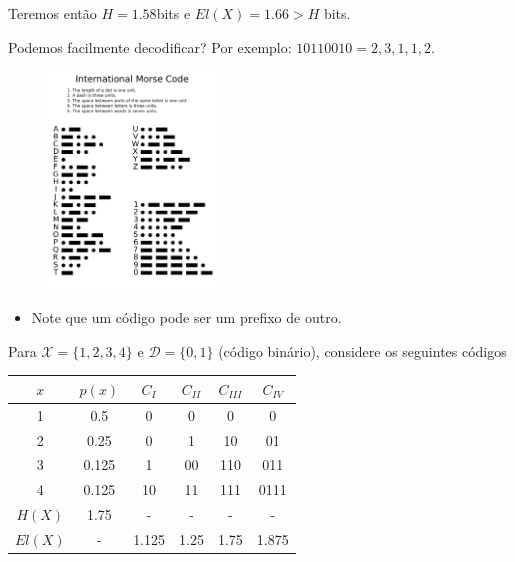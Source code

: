 \begin{frame}[allowframebreaks]
\begin{example}
  Teremos então $H = 1.58$bits e $El(X)=1.66 > H$ bits.
  \end{example}

  Podemos facilmente decodificar? Por exemplo: $10110010 = 2,3,1,1,2$.


  \framebreak


  \begin{figure}[h!]
  \centering
  \includegraphics[width=0.4\textwidth]{images/International_Morse_Code.pdf}
  \label{fig:International_Morse_Code}
  \end{figure}

  \begin{itemize}
  \item Note que um código pode ser um prefixo de outro.
  \end{itemize}

  \framebreak

  Para $\mathcal{X} = \{1,2,3,4\}$ e $\mathcal{D}=\{0,1\}$ (código binário), considere os seguintes códigos

  \begin{center}
  \begin{tabular}{c|c|c|c|c|c}
  $x$ 		& $p(x)$& $C_I$ & $C_{II}$ & $C_{III}$ & $C_{IV}$ \\ \hline
  1		& 0.5	&  0	&   0	&  0 		&   0	\\ 
  2		& 0.25	&  0	&   1 	& 10		&  01	\\
  3		& 0.125	&  1	&  00	& 110		& 011 	\\
  4		& 0.125	& 10	&  11	& 111 		& 0111 	\\
  $H(X)$	& 1.75	&  -	&  -	&  -		&  -	\\
  $El(X)$ 	&  -	& 1.125	& 1.25	&  1.75		& 1.875
  \end{tabular}
  \end{center} 


\end{frame}
